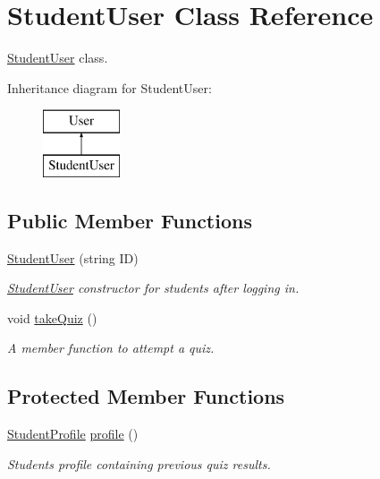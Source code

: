 \hypertarget{class_student_user}{}\section{Student\+User Class Reference}
\label{class_student_user}


\hyperlink{class_student_user}{Student\+User} class.  


Inheritance diagram for Student\+User\+:\begin{figure}[H]
\begin{center}
\leavevmode
\includegraphics[height=2.000000cm]{class_student_user}
\end{center}
\end{figure}
\subsection*{Public Member Functions}
\begin{DoxyCompactItemize}
\item 
\hyperlink{class_student_user_ad518425f2cf0507128d638be6bb869d0}{Student\+User} (string I\+D)
\begin{DoxyCompactList}\small\item\em \hyperlink{class_student_user}{Student\+User} constructor for students after logging in. \end{DoxyCompactList}\item 
\hypertarget{class_student_user_a07d679b3034bf8c2d70dcda7b196fd6b}{}void \hyperlink{class_student_user_a07d679b3034bf8c2d70dcda7b196fd6b}{take\+Quiz} ()\label{class_student_user_a07d679b3034bf8c2d70dcda7b196fd6b}

\begin{DoxyCompactList}\small\item\em A member function to attempt a quiz. \end{DoxyCompactList}\end{DoxyCompactItemize}
\subsection*{Protected Member Functions}
\begin{DoxyCompactItemize}
\item 
\hypertarget{class_student_user_ace0179d78b516453d662b89d21438888}{}\hyperlink{class_student_profile}{Student\+Profile} \hyperlink{class_student_user_ace0179d78b516453d662b89d21438888}{profile} ()\label{class_student_user_ace0179d78b516453d662b89d21438888}

\begin{DoxyCompactList}\small\item\em Student\textquotesingle{}s profile containing previous quiz results. \end{DoxyCompactList}\end{DoxyCompactItemize}
